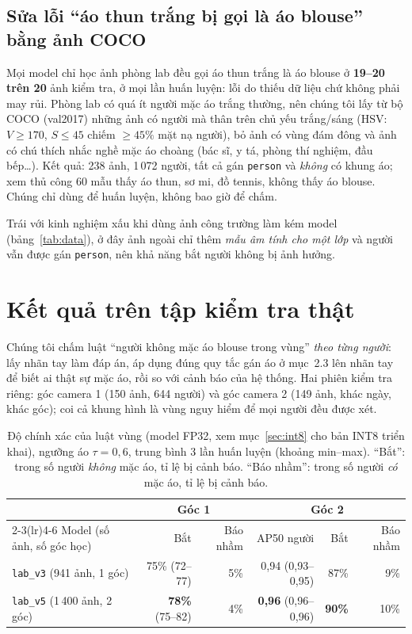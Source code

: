 \documentclass[12pt,a4paper]{article}
\begin{document}
\subsection{Sửa lỗi ``áo thun trắng bị gọi là áo blouse'' bằng ảnh COCO}
\label{sec:coco}

Mọi model chỉ học ảnh phòng lab đều gọi áo thun trắng là áo blouse ở \textbf{19--20 trên 20} ảnh kiểm tra, ở mọi lần
huấn luyện: lỗi do thiếu dữ liệu chứ không phải may rủi. Phòng lab có quá ít người mặc áo trắng thường, nên chúng tôi
lấy từ bộ COCO (val2017) những ảnh có người mà thân trên chủ yếu trắng/sáng (HSV: $V\ge170$, $S\le45$ chiếm
$\ge45\%$ mặt nạ người), bỏ ảnh có vùng đám đông và ảnh có chú thích nhắc nghề mặc áo choàng (bác sĩ, y tá, phòng
thí nghiệm, đầu bếp\dots). Kết quả: 238 ảnh, 1\,072 người, tất cả gán \texttt{person} và \emph{không} có khung áo; xem
thủ công 60 mẫu thấy áo thun, sơ mi, đồ tennis, không thấy áo blouse. Chúng chỉ dùng để huấn luyện, không bao giờ để chấm.

Trái với kinh nghiệm xấu khi dùng ảnh công trường làm kém model (bảng~\ref{tab:data}), ở đây ảnh ngoài chỉ thêm
\emph{mẫu âm tính cho một lớp} và người vẫn được gán \texttt{person}, nên khả năng bắt người không bị ảnh hưởng.

\section{Kết quả trên tập kiểm tra thật}
\label{sec:results}

Chúng tôi chấm luật ``người không mặc áo blouse trong vùng'' \emph{theo từng người}: lấy nhãn tay làm đáp án, áp dụng
đúng quy tắc gán áo ở mục~2.3 lên nhãn tay để biết ai thật sự mặc áo, rồi so với cảnh báo của hệ thống. Hai phiên
kiểm tra riêng: góc camera 1 (150 ảnh, 644 người) và góc camera 2 (149 ảnh, khác ngày, khác góc); coi cả khung hình
là vùng nguy hiểm để mọi người đều được xét.

\begin{table}[ht]
\centering
\caption{Độ chính xác của luật vùng (model FP32, xem mục~\ref{sec:int8} cho bản INT8 triển khai), ngưỡng áo $\tau=0{,}6$, trung bình 3 lần huấn luyện (khoảng min--max).
``Bắt'': trong số người \emph{không} mặc áo, tỉ lệ bị cảnh báo. ``Báo nhầm'': trong số người \emph{có} mặc áo, tỉ lệ bị cảnh báo.}
\label{tab:acc}
\small
\begin{tabular}{lrrrrr}
\toprule
 & \multicolumn{2}{c}{Góc 1} & \multicolumn{3}{c}{Góc 2} \\
\cmidrule(lr){2-3}\cmidrule(lr){4-6}
Model (số ảnh, số góc học) & Bắt & Báo nhầm & AP50 người & Bắt & Báo nhầm \\
\midrule
\texttt{lab\_v3} (941 ảnh, 1 góc) & 75\% (72--77) & 5\% & 0,94 (0,93--0,95) & 87\% & 9\% \\
\texttt{lab\_v5} (1\,400 ảnh, 2 góc) & \textbf{78\%} (75--82) & 4\% & \textbf{0,96} (0,96--0,96) & \textbf{90\%} & 10\% \\
\bottomrule
\end{tabular}
\end{table}
\end{document}
